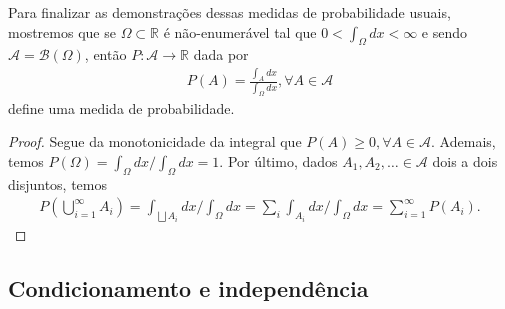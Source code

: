 \documentclass[../Notas.tex]{subfiles}
\begin{document}
Para finalizar as demonstrações dessas medidas de probabilidade usuais, mostremos que se $\Omega \subset\mathbb{R}$ é não-enumerável tal que $\displaystyle{0 < \int_{\Omega}}dx < \infty$ e sendo $\mathcal{A} = \mathcal{B}(\Omega)$, então $P:\mathcal{A}\to\mathbb{R}$ dada por
\begin{align}
    P(A) = \frac{\int_A dx}{\int_{\Omega}dx}, \forall A\in\mathcal{A}
\end{align}
define uma medida de probabilidade.
\begin{proof}
Segue da monotonicidade da integral que $P(A)\geq 0, \forall A\in\mathcal{A}$. Ademais, temos $P(\Omega) = \displaystyle{ \int_{\Omega}dx / \int_{\Omega}dx = 1}$. Por último, dados $A_1, A_2, \dots \in \mathcal{A}$ dois a dois disjuntos, temos
\begin{align*}
    P\left( \bigcup_{i=1}^{\infty} A_i \right) = \int_{\bigsqcup A_i}dx / \int_{\Omega} dx = \sum_i \int_{A_i}dx/\int_{\Omega}dx = \sum_{i=1}^{\infty} P(A_i).
\end{align*}
\end{proof}


\subsection{Condicionamento e independência}
\end{document}
